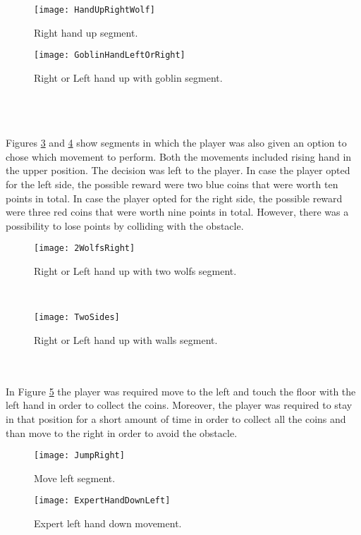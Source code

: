 \begin{figure}[h]
    \centering
    \texttt{[image: HandUpRightWolf]}
    \caption{Right hand up segment.}
    \label{fig:wolfRight}
\end{figure}
\begin{figure}[h]
    \centering
    \texttt{[image: GoblinHandLeftOrRight]}
    \caption{Right or Left hand up with goblin segment.}
    \label{fig:goblin}
\end{figure}\\\\\\
Figures \ref{fig:2wolfs} and \ref{fig:2sides} show segments in which the player was also given an option to chose which movement to perform. Both the movements included rising hand in the upper position. The decision was left to the player. In case the player opted for the left side, the possible reward were two blue coins that were worth ten points in total. In case the player opted for the right side, the possible reward were three red coins that were worth nine points in total. However, there was a possibility to lose points by colliding with the obstacle.\\
\begin{figure}[h]
    \centering
    \texttt{[image: 2WolfsRight]}
    \caption{Right or Left hand up with two wolfs segment.}
    \label{fig:2wolfs}
\end{figure}\\
\begin{figure}[h]
    \centering
    \texttt{[image: TwoSides]}
    \caption{Right or Left hand up with walls segment.}
    \label{fig:2sides}
\end{figure}\\\\
In Figure \ref{fig:jumpleft} the player was required move to the left and touch the floor with the left hand in order to collect the coins. Moreover, the player was required to stay in that position for a short amount of time in order to collect all the coins and than move to the right in order to avoid the obstacle.
\begin{figure}[h]
    \centering
    \texttt{[image: JumpRight]}
    \caption{Move left segment.}
    \label{fig:jumpleft}
\end{figure}
\begin{figure}[h]
    \centering
    \texttt{[image: ExpertHandDownLeft]}
    \caption{Expert left hand down movement.}
    \label{fig:expertLeftDown}
\end{figure}\\
